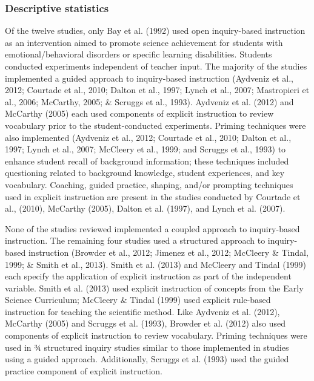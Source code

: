\documentclass[11.5pt]{sig-alternate} %
\begin{document}
\begin{large}
\subsubsection*{Descriptive statistics}
Of the twelve studies, only Bay et al. (1992) used open inquiry-based instruction as an intervention aimed to promote science achievement for students with emotional/behavioral disorders or specific learning disabilities.  Students conducted experiments independent of teacher input.  The majority of the studies implemented a guided approach to inquiry-based instruction (Aydveniz et al., 2012; Courtade et al., 2010; Dalton et al., 1997; Lynch et al., 2007; Mastropieri et al., 2006; McCarthy, 2005; \& Scruggs et al., 1993). Aydveniz et al. (2012) and McCarthy (2005) each used components of explicit instruction to review vocabulary prior to the student-conducted experiments.  Priming techniques were also implemented (Aydveniz et al., 2012; Courtade et al., 2010; Dalton et al., 1997; Lynch et al., 2007; McCleery et al., 1999; and Scruggs et al., 1993) to enhance student recall of background information; these techniques included questioning related to background knowledge, student experiences, and key vocabulary.  Coaching, guided practice, shaping, and/or prompting techniques used in explicit instruction are present in the studies conducted by Courtade et al., (2010), McCarthy (2005), Dalton et al. (1997), and Lynch et al. (2007). 

None of the studies reviewed implemented a coupled approach to inquiry-based instruction.  The remaining four studies used a structured approach to inquiry-based instruction (Browder et al., 2012; Jimenez et al., 2012; McCleery \& Tindal, 1999; \& Smith et al., 2013).  Smith et al. (2013) and McCleery and Tindal (1999) each specify the application of explicit instruction as part of the independent variable.  Smith et al. (2013) used explicit instruction of concepts from the Early Science Curriculum; McCleery \& Tindal (1999) used explicit rule-based instruction for teaching the scientific method.  Like Aydveniz et al. (2012), McCarthy (2005) and Scruggs et al. (1993), Browder et al. (2012) also used components of explicit instruction to review vocabulary.  Priming techniques were used in ¾ structured inquiry studies similar to those implemented in studies using a guided approach.  Additionally, Scruggs et al. (1993) used the guided practice component of explicit instruction. 


\end{large}
\end{document}
